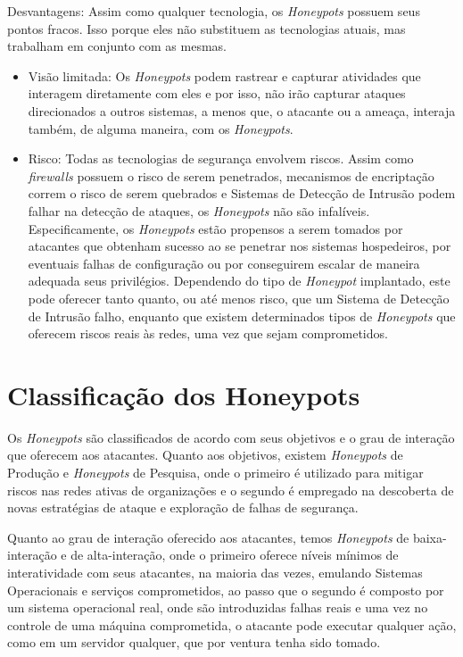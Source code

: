 Desvantagens: Assim como qualquer tecnologia, os \textit{Honeypots} possuem seus pontos fracos. Isso porque eles não substituem as tecnologias atuais, mas trabalham em conjunto com as mesmas.
\begin{itemize}
    \item Visão limitada: Os \textit{Honeypots} podem rastrear e capturar atividades que interagem diretamente com eles e por isso, não irão capturar ataques direcionados a outros sistemas, a menos que, o atacante ou a ameaça, interaja também, de alguma maneira, com os \textit{Honeypots}.
    \item Risco: Todas as tecnologias de segurança envolvem riscos. Assim como \textit{firewalls} possuem o risco de serem penetrados, mecanismos de encriptação correm o risco de serem quebrados e Sistemas de Detecção de Intrusão podem falhar na detecção de ataques, os \textit{Honeypots} não são infalíveis. Especificamente, os \textit{Honeypots} estão propensos a serem tomados por atacantes que obtenham sucesso ao se penetrar nos sistemas hospedeiros, por eventuais falhas de configuração ou por conseguirem escalar de maneira adequada seus privilégios. Dependendo do tipo de \textit{Honeypot} implantado, este pode oferecer tanto quanto, ou até menos risco, que um Sistema de Detecção de Intrusão falho, enquanto que existem determinados tipos de \textit{Honeypots} que oferecem riscos reais às redes, uma vez que sejam comprometidos.
\end{itemize}




\section{Classificação dos Honeypots}

Os \textit{Honeypots} são classificados de acordo com seus objetivos e o grau de interação que oferecem aos atacantes. Quanto aos objetivos, existem \textit{Honeypots} de Produção e \textit{Honeypots} de Pesquisa, onde o primeiro é utilizado para mitigar riscos nas redes ativas de organizações e o segundo é empregado na descoberta de novas estratégias de ataque e exploração de falhas de segurança. \cite{HoneynetsEducationalResource}

Quanto ao grau de interação oferecido aos atacantes, temos \textit{Honeypots} de baixa-interação e de alta-interação, onde o primeiro oferece níveis mínimos de interatividade com seus atacantes, na maioria das vezes, emulando Sistemas Operacionais e serviços comprometidos, ao passo que o segundo é composto por um sistema operacional real, onde são introduzidas falhas reais e uma vez no controle de uma máquina comprometida, o atacante pode executar qualquer ação, como em um servidor qualquer, que por ventura tenha sido tomado. \cite{TrappingTheHackers}

